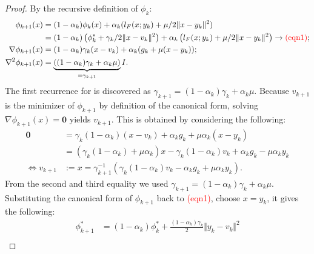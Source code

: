 \documentclass[12pt]{article}
\begin{document}
    \begin{proof}
        By the recursive definition of $\phi_k$: 
        \begin{align*}
            \phi_{k + 1}(x) 
            &= 
            (1 - \alpha_k)\phi_k(x) + \alpha_k (l_F(x; y_k) + \mu/2\Vert x - y_k\Vert^2)
            \\
            &= 
            (1 -\alpha_k)
            \left(
                \phi_k^* + \gamma_k/2\Vert x - v_k\Vert^2
            \right) 
            + 
            \alpha_k
            \left(
                l_F(x; y_k) + \mu/2\Vert x - y_k\Vert^2
            \right)
            \rightarrow \textcolor{red}{(\text{eqn1})}; 
            \\
            \nabla \phi_{k + 1}(x) 
            &= 
            (1 - \alpha_k)\gamma_k(x - v_k) + \alpha_k(g_k + \mu (x - y_k));
            \\
            \nabla^2 \phi_{k + 1}(x) &= 
            \underbrace{((1 - \alpha_k)\gamma_k + \alpha_k \mu)}_{=\gamma_{k + 1}}I. 
        \end{align*}
        The first recurrence for is discovered as $\gamma_{k + 1} = (1 - \alpha_k)\gamma_k + \alpha_k \mu$. 
        Because $v_{k + 1}$ is the minimizer of $\phi_{k+ 1}$ by definition of the canonical form, solving $\nabla \phi_{k + 1}(x) = \mathbf 0 $ yields $v_{k + 1}$. 
        This is obtained by considering the following: 
        \begin{align*}
            \mathbf 0 &= 
            \gamma_k(1 - \alpha_k)(x - v_k) + \alpha_k g_k + \mu \alpha_k(x - y_k)
            \\
            &= (\gamma_k(1 - \alpha_k) + \mu \alpha_k)x - 
            \gamma_k(1 - \alpha_k)v_k + \alpha_k g_k - \mu \alpha_k y_k
            \\
            \iff 
            v_{k + 1} &:= x=
            \gamma_{k +1}^{-1} 
            \left(
                \gamma_k(1 - \alpha_k) v_k - \alpha_k g_k + \mu \alpha_k y_k
            \right). 
        \end{align*}
        From the second and third equality we used $\gamma_{k + 1} = (1 - \alpha_k)\gamma_k + \alpha_k \mu$. 
        Substituting the canonical form of $\phi_{k + 1}$ back to \textcolor{red}{(eqn1)}, choose $x = y_k$, it gives the following: 
        \begin{align*}
            \phi_{k + 1}^* 
            &= (1 - \alpha_k)\phi_k^* + \frac{(1 - \alpha_k)\gamma_k}{2}\Vert y_k - v_k\Vert^2   
            \\

\end{align*}
\end{proof}
\end{document}
